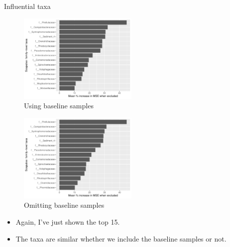 \documentclass{beamer}
\begin{document}
\begin{frame}{Influential taxa}

  \begin{minipage}{0.47\textwidth}
    \begin{figure}
    \includegraphics[width=2.25in]{HenleyLake/bacteria/use_families/w_scapulae/w_baseline/families_scapula_PercIncMSE_barchart}
    \caption{Using baseline samples}
\end{figure}
\end{minipage}
\begin{minipage}{0.47\textwidth}
  \begin{figure}
    \includegraphics[width=2.25in]{HenleyLake/bacteria/use_families/w_scapulae/no_baseline/families_scapula_no_baseline_PercIncMSE_barchart}
    \caption{Omitting baseline samples}
  \end{figure}
  \end{minipage}
  \vspace{0.1in}
  {\scriptsize
  \begin{itemize}
  \item Again, I've just shown the top 15.
  \item The taxa are similar whether we include the baseline samples or not.
  \end{itemize}
  }

\end{frame}
\end{document}
